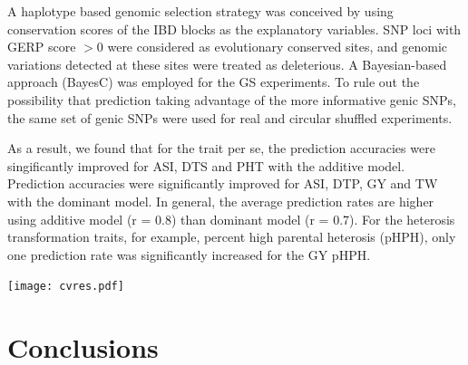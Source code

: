\documentclass[a0,portrait]{a0poster}
\begin{document}
\begin{multicols}{2}
A haplotype based genomic selection strategy was conceived by using conservation scores of the IBD blocks as the explanatory variables. SNP loci with GERP score $>$0 were considered as evolutionary conserved sites, and genomic variations detected at these sites were treated as deleterious. A Bayesian-based approach (BayesC) \citep{} was employed for the GS experiments. To rule out the possibility that prediction taking advantage of the more informative genic SNPs, the same set of genic SNPs were used for real and circular shuffled experiments.

As a result, we found that for the trait per se, the prediction accuracies were singificantly improved for ASI, DTS and PHT with the additive model. Prediction accuracies were significantly improved for ASI, DTP, GY and TW with the dominant model. In general, the average prediction rates are higher using additive model (r = 0.8) than dominant model (r = 0.7). For the heterosis transformation traits, for example, percent high parental heterosis (pHPH), only one prediction rate was significantly increased for the GY pHPH. 

\begin{center}\vspace{1cm}
\texttt{[image: cvres.pdf]}
\end{center}\vspace{1cm}


\color{SaddleBrown} %

\section*{Conclusions}


\end{multicols}
\end{document}
